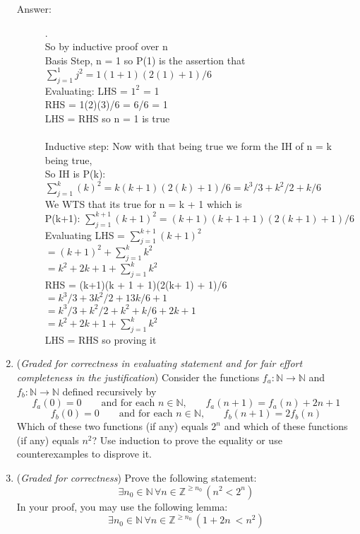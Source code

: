 \documentclass[12pt, oneside]{article}
\begin{document}
\begin{enumerate}
\begin{description}
    \item[Answer:] .\\
    So by inductive proof over n\\
    Basis Step, n = 1 so P(1) is the assertion that\\
    $\sum_{j=1}^{1} j^2 = 1(1 + 1)(2(1) + 1)/6  $\\
    Evaluating: LHS = $1^2$ = 1\\
    RHS = 1(2)(3)/6 = 6/6 = 1\\
    LHS = RHS so n = 1 is true\\\\
    Inductive step: Now with that being true we form the IH of n = k being true,\\
    So IH is P(k): $\sum_{j=1}^{k} (k)^2 = k(k + 1)(2(k) + 1)/6  = k^3/3 + k^2/2 + k/6$\\
    We WTS that its true for n = k + 1 which is\\
    P(k+1): $\sum_{j=1}^{k+1} (k+1)^2 = (k+1)(k + 1 + 1)(2(k+ 1) + 1)/6$\\
    Evaluating LHS = $\sum_{j=1}^{k+1} (k+1)^2$\\
    $= (k+1)^2 + \sum_{j=1}^{k} k^2$\\
    $= k^2 + 2k + 1 + \sum_{j=1}^{k} k^2$\\
    RHS = (k+1)(k + 1 + 1)(2(k+ 1) + 1)/6\\
    $= k^3/3 + 3k^2/2 + 13k/6 + 1$\\
    $= k^3/3 + k^2/2 + k^2 + k/6 + 2k + 1$\\
    $= k^2 + 2k + 1 + \sum_{j=1}^{k} k^2$\\
    LHS = RHS so proving it
\end{description}

\item ({\it Graded for correctness in evaluating statement 
and for fair effort completeness in the justification}) Consider the functions $f_a: \mathbb{N} \to \mathbb{N}$ and $f_b: \mathbb{N} \to \mathbb{N}$ 
defined recursively by 
\[
f_a(0) = 0 \qquad\text{and for each $n \in \mathbb{N}$,} \qquad f_a(n+1) = f_a(n) + 2n + 1
\]
\[
f_b(0) = 0 \qquad\text{and for each $n \in \mathbb{N}$,} \qquad f_b(n+1) = 2f_b(n)
\]
Which of these two functions (if any) equals $2^n$ and which of these functions (if any) equals $n^2$? Use induction to prove the equality or use counterexamples to disprove it.

\item ({\it Graded for correctness}) Prove the following statement:
$$\exists n_0 \in \mathbb{N} \, \forall n \in \mathbb{Z}^{\geq n_0} \, (n^2 < 2^n)$$
In your proof, you may use the following lemma:
$$\exists n_0 \in \mathbb{N} \, \forall n \in \mathbb{Z}^{\geq n_0} \, (1+2n~ < n^2)$$


\end{enumerate}
\end{document}
